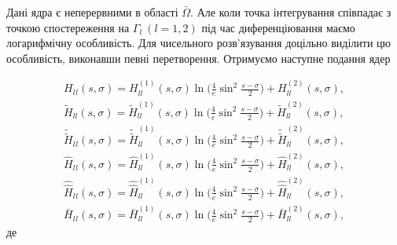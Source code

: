 \documentclass[12pt]{report}
\begin{document}
  Дані ядра є неперервними в області $\bar{\Omega}$. Але коли точка інтегрування співпадає з точкою спостереження на $\Gamma_l \ (l=1,2)$ під час диференціювання маємо логарифмічну особливість. Для чисельного розв'язування доцільно виділити цю особливість, виконавши певні перетворення. Отримуємо наступне подання ядер 
  
 \begin{gather}
 	H_l{_l}(s, \sigma)=H^{(1)}_{ll}(s, \sigma)\ln\bigg(\frac{4}{e}\sin^2\frac{s-\sigma}{2}\bigg)+H^{(2)}_{ll}(s, \sigma), \\
	\tilde{H}_{ll}(s, \sigma)=\tilde{H}^{(1)}_{ll}(s, \sigma)\ln\bigg(\frac{4}{e}\sin^2\frac{s-\sigma}{2}\bigg)+\tilde{H}^{(2)}_{ll}(s, \sigma), \\
	\tilde{\tilde{H}}_l{_l}(s, \sigma)=\tilde{\tilde{H}}^{(1)}_{ll}(s, \sigma)\ln\bigg(\frac{4}{e}\sin^2\frac{s-\sigma}{2}\bigg)+\tilde{\tilde{H}}^{(2)}_{ll}(s, \sigma), \\
	\hat{H}_l{_l}(s, \sigma)=\hat{H}^{(1)}_{ll}(s, \sigma)\ln\bigg(\frac{4}{e}\sin^2\frac{s-\sigma}{2}\bigg)+\hat{H}^{(2)}_{ll}(s, \sigma), \\ 
	\hat{\hat{H}}_l{_l}(s, \sigma)=\hat{\hat{H}}^{(1)}_{ll}(s, \sigma)\ln\bigg(\frac{4}{e}\sin^2\frac{s-\sigma}{2}\bigg)+\hat{\hat{H}}^{(2)}_{ll}(s, \sigma), \\
	\bar{H}_l{_l}(s, \sigma)=\bar{H}^{(1)}_{ll}(s, \sigma)\ln\bigg(\frac{4}{e}\sin^2\frac{s-\sigma}{2}\bigg)+\bar{H}^{(2)}_{ll}(s, \sigma),
 \end{gather}
 де 
\end{document}
